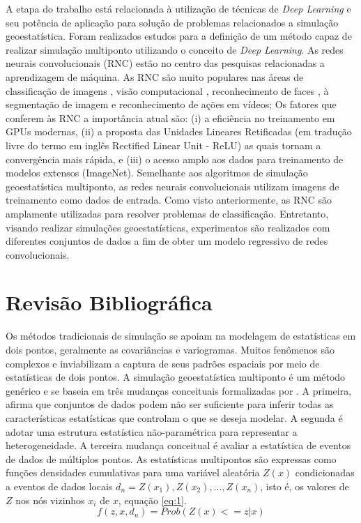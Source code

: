 \documentclass[11pt]{article}
\begin{document}
A etapa do trabalho está relacionada à utilização de técnicas de \textit{Deep Learning} e seu potência de aplicação para solução de
problemas relacionados a simulação geoestatística. Foram realizados estudos para a definição de um método capaz de realizar
simulação multiponto utilizando o conceito de \textit{Deep Learning}. As redes neurais convolucionais (RNC) estão no centro
das pesquisas relacionadas a aprendizagem de máquina. As RNC são muito populares nas áreas de classificação de imagens \cite{Krizhevsky2012,He2014},
visão computacional \cite{Zhangg_2014}, reconhecimento de faces \cite{NyiSun2014}, à segmentação de imagem e reconhecimento de ações em vídeos;
Os fatores que conferem às RNC a importância atual são: (i) a eficiência no treinamento em GPUs modernas, (ii) a proposta das Unidades Lineares Retificadas
(em tradução livre do termo em inglês Rectified Linear Unit - ReLU)  as quais tornam a convergência mais rápida,
e (iii) o acesso amplo aos dados para treinamento de modelos extensos (ImageNet)\cite{Krizhevsky2012}.
Semelhante aos algoritmos de simulação geoestatística multiponto, as redes neurais convolucionais utilizam imagens de treinamento como dados de entrada.
Como visto anteriormente, as RNC são amplamente utilizadas para resolver problemas de classificação. Entretanto, visando realizar simulações
geoestatísticas, experimentos são realizados com diferentes conjuntos de dados a fim de obter um modelo regressivo de redes convolucionais.


\section{Revisão Bibliográfica}

Os métodos tradicionais de simulação se apoiam na modelagem de estatísticas em dois pontos, geralmente as covariâncias e variogramas. Muitos
fenômenos são complexos e inviabilizam a captura de seus padrões espaciais por meio de estatísticas de dois pontos. A simulação
geoestatística multiponto é um método genérico e se
baseia em três mudanças conceituais formalizadas por \cite{Guardiano1993}. A primeira, afirma que conjuntos de dados podem não ser suficiente
para inferir todas as características estatísticas que controlam o que se deseja modelar. A segunda é adotar uma estrutura estatística
não-paramétrica para representar a heterogeneidade. A terceira mudança conceitual é avaliar a estatística de eventos de dados de múltiplos
pontos. As estatísticas multipontos são expressas como funções densidades cumulativas para uma variável aleatória $Z(x)$ condicionadas
a eventos de dados locais $d_n =  {Z(x_1), Z(x_2),...,Z(x_n)}$, isto é, os valores de $Z$ nos nós vizinhos $x_i$ de $x$, equação \ref{eq:1}.
\begin{equation}
 f(z, x, d_n) = Prob({Z(x)<=z|x})
 \label{eq:1}
\end{equation}
\end{document}

